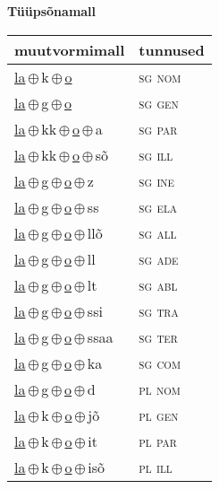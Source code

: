

\vspace{3.5em}
\noindent \begin{minipage}{\textwidth}
\noindent \textbf{Tüüpsõnamall \,}\\

\begin{sideways}
\begin{tabular}{l l}
muutvormimall & tunnused \\
\hline
\underline{la}\,$\oplus$\,k\,$\oplus$\,\underline{o} & \textsc{ sg nom } \\
\underline{la}\,$\oplus$\,g\,$\oplus$\,\underline{o} & \textsc{ sg gen } \\
\underline{la}\,$\oplus$\,kk\,$\oplus$\,\underline{o}\,$\oplus$\,a & \textsc{ sg par } \\
\underline{la}\,$\oplus$\,kk\,$\oplus$\,\underline{o}\,$\oplus$\,sõ & \textsc{ sg ill } \\
\underline{la}\,$\oplus$\,g\,$\oplus$\,\underline{o}\,$\oplus$\,z & \textsc{ sg ine } \\
\underline{la}\,$\oplus$\,g\,$\oplus$\,\underline{o}\,$\oplus$\,ss & \textsc{ sg ela } \\
\underline{la}\,$\oplus$\,g\,$\oplus$\,\underline{o}\,$\oplus$\,llõ & \textsc{ sg all } \\
\underline{la}\,$\oplus$\,g\,$\oplus$\,\underline{o}\,$\oplus$\,ll & \textsc{ sg ade } \\
\underline{la}\,$\oplus$\,g\,$\oplus$\,\underline{o}\,$\oplus$\,lt & \textsc{ sg abl } \\
\underline{la}\,$\oplus$\,g\,$\oplus$\,\underline{o}\,$\oplus$\,ssi & \textsc{ sg tra } \\
\underline{la}\,$\oplus$\,g\,$\oplus$\,\underline{o}\,$\oplus$\,ssaa & \textsc{ sg ter } \\
\underline{la}\,$\oplus$\,g\,$\oplus$\,\underline{o}\,$\oplus$\,ka & \textsc{ sg com } \\
\underline{la}\,$\oplus$\,g\,$\oplus$\,\underline{o}\,$\oplus$\,d & \textsc{ pl nom } \\
\underline{la}\,$\oplus$\,k\,$\oplus$\,\underline{o}\,$\oplus$\,jõ & \textsc{ pl gen } \\
\underline{la}\,$\oplus$\,k\,$\oplus$\,\underline{o}\,$\oplus$\,it & \textsc{ pl par } \\
\underline{la}\,$\oplus$\,k\,$\oplus$\,\underline{o}\,$\oplus$\,isõ & \textsc{ pl ill } \\

\end{tabular}
\end{sideways}
\end{minipage}
